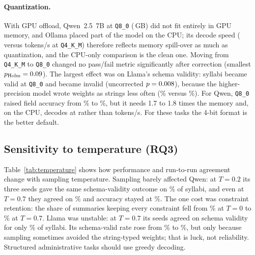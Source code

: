 \documentclass[sigconf,nonacm]{acmart}
\newcommand{\fitbox}[2]{\sbox{\fitboxbox}{#2}%
  \ifdim\wd\fitboxbox>#1\resizebox{#1}{!}{\usebox{\fitboxbox}}\else\usebox{\fitboxbox}\fi}
\begin{document}
\paragraph{Quantization.}
With GPU offload, Qwen~2.5~7B at \texttt{Q8\_0} (\SizeIntelQwenQeight{}\,GB) did not fit entirely in GPU memory, and Ollama placed part of the model on the CPU; its decode speed (\TpsIntelQwenQeight{} versus \TpsIntelQwenQfour{} tokens/s at \texttt{Q4\_K\_M}) therefore reflects memory spill-over as much as quantization, and the CPU-only comparison is the clean one.
Moving from \texttt{Q4\_K\_M} to \texttt{Q8\_0} changed no pass/fail metric significantly after correction (smallest $p_{\text{Holm}}=0.09$).
The largest effect was on Llama's schema validity: \QuantLlamaSchemaImp{} syllabi became valid at \texttt{Q8\_0} and \QuantLlamaSchemaWor{} became invalid (uncorrected $p=0.008$), because the higher-precision model wrote weights as strings less often (\TypeErrLlamaQeight\% versus \TypeErrLlamaQfour\%).
For Qwen, \texttt{Q8\_0} raised field accuracy from \FieldAccQwenQfour\% to \FieldAccQwenQeight\%, but it needs 1.7 to 1.8 times the memory and, on the CPU, decodes at \TpsIntelNoGPUQwenQeight{} rather than \TpsIntelNoGPUQwenQfour{} tokens/s.
For these tasks the 4-bit format is the better default.

\subsection{Sensitivity to temperature (RQ3)}
Table~\ref{tab:temperature} shows how performance and run-to-run agreement change with sampling temperature.
Sampling barely affected Qwen: at $T=0.2$ its three seeds gave the same schema-validity outcome on \TempAgreeSchemaQwenQfourLo\% of syllabi, and even at $T=0.7$ they agreed on \TempAgreeSchemaQwenQfourHi\% and accuracy stayed at \TempAccQwenQfourHi\%.
The one cost was constraint retention: the share of summaries keeping every constraint fell from \AllRetainQwenQfour\% at $T=0$ to \TempAllRetainQwenQfourHi\% at $T=0.7$.
Llama was unstable: at $T=0.7$ its seeds agreed on schema validity for only \TempAgreeSchemaLlamaQfourHi\% of syllabi.
Its schema-valid rate rose from \SchemaLlamaQfour\% to \TempSchemaLlamaQfourHi\%, but only because sampling sometimes avoided the string-typed weights; that is luck, not reliability.
Structured administrative tasks should use greedy decoding.

\begin{table}[t]
\caption{Effect of sampling temperature (\texttt{Q4\_K\_M}). For $T>0$, values average three seeds per item. Seed agreement is the share of items where all three seeds gave the same pass/fail outcome.}
\label{tab:temperature}
\small
\fitbox{\columnwidth}{}
\end{table}
\end{document}
